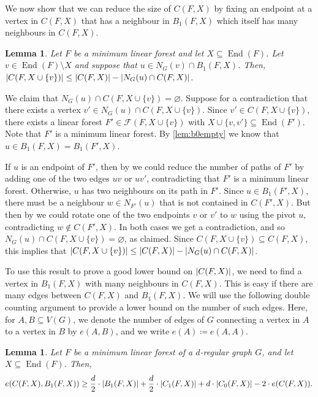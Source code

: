 \documentclass[11pt]{article}
\makeatletter
\theoremstyle{plain}
\newtheorem{lemma}[theorem]{Lemma}
\theoremstyle{definition}
\renewenvironment{proof}[1][\proofname]
{\par\pushQED{\qed}
	\normalfont\topsep6\p@\@plus6\p@\relax\trivlist
	\item[\hskip\labelsep\bfseries#1\@addpunct{.}]
	\ignorespaces}
{\popQED\endtrivlist\@endpefalse}
\let\emptyset\varnothing
\newcommand{\cF}{\mathcal F}
\DeclarePairedDelimiter{\abs}{\lvert}{\rvert}
\DeclareMathOperator{\End}{End}
\makeatother
\begin{document}
We now show that we can reduce the size of $C(F,X)$ by fixing an endpoint at a vertex in $C(F,X)$ that has a neighbour in $B_1(F,X)$ which itself has many neighbours in $C(F,X)$.

\begin{lemma}\label{lem:fixneighbourofb1}
    Let $F$ be a minimum linear forest and let $X \subseteq \End(F)$. Let $v \in \End(F) \setminus X$ and suppose that $u \in N_G(v) \cap B_1(F,X)$. Then, $\abs{C(F,X \cup \{v\})} \le \abs{C(F,X)} - \abs{N_G(u) \cap C(F,X)}$.
\end{lemma}

\begin{proof}
    We claim that $N_G(u) \cap C(F,X \cup \{v\}) = \emptyset$. Suppose for a contradiction that there exists a vertex $v' \in N_G(u) \cap C(F,X \cup \{v\})$. Since $v' \in C(F,X \cup \{v\})$, there exists a linear forest $F' \in \cF(F,X \cup \{v\})$ with $X \cup \{v, v'\} \subseteq \End(F')$. Note that $F'$ is a minimum linear forest. By \cref{lem:b0empty} we know that $u \in B_1(F,X) = B_1(F',X)$.

    If $u$ is an endpoint of $F'$, then by  we could reduce the number of paths of $F'$ by adding one of the two edges $u v$ or $u v'$, contradicting that $F'$ is a minimum linear forest. Otherwise, $u$ has two neighbours on its path in $F'$. Since $u \in B_1(F',X)$, there must be a neighbour $w \in N_{F'}(u)$ that is not contained in $C(F',X)$. But then by  we could rotate one of the two endpoints $v$ or $v'$ to $w$ using the pivot $u$, contradicting $w \notin C(F',X)$. In both cases we get a contradiction, and so $N_G(u) \cap C(F,X \cup \{v\}) = \emptyset$, as claimed. Since $C(F,X \cup \{v\}) \subseteq C(F,X)$, this implies that $\abs{C(F,X \cup \{v\})} \le \abs{C(F,X)} - \abs{N_G(u) \cap C(F,X)}$.
\end{proof}

To use this result to prove a good lower bound on $\abs{C(F,X)}$, we need to find a vertex in $B_1(F,X)$ with many neighbours in $C(F,X)$. This is easy if there are many edges between $C(F,X)$ and $B_1(F,X)$. We will use the following double counting argument to provide a lower bound on the number of such edges. Here, for $A, B \subseteq V(G)$, we denote the number of edges of $G$ connecting a vertex in $A$ to a vertex in $B$ by $e(A,B)$, and we write $e(A) \coloneqq e(A,A)$.

\begin{lemma}\label{lem:doublecount}
    Let $F$ be a minimum linear forest of a $d$-regular graph $G$, and let $X \subseteq \End(F)$. Then,
    \[
        e(C(F,X),B_1(F,X)) \ge \frac{d}{2} \cdot \abs{B_1(F,X)} + \frac{d}{2} \cdot \abs{C_1(F,X)} + d \cdot \abs{C_0(F,X)} - 2 \cdot e(C(F,X)).
    \]
\end{lemma}
\end{document}
